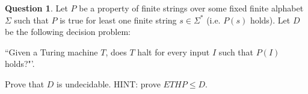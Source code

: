 \documentclass{article}
\theoremstyle{definition}
\newtheorem{Q}{Question}
\begin{document}
\begin{Q}
Let $P$ be a property of finite strings over some fixed finite alphabet $\Sigma$ such that $P$ is true for least one finite string $s\in\Sigma^*$ (i.e. $P(s)$ holds). Let $D$ be the following decision problem: 

``Given a Turing machine $T$, does $T$ halt for every input $I$ such that $P(I)$ holds?"'.

Prove that $D$ is undecidable. HINT: prove $ETHP\leq D$.
\end{Q}
\begin{comment}
\textbf{Solution}
Let $T$ be a Turing machine (an instance of ETHP). Define the machine $M_T$ that operates as follows:
\begin{enumerate}
\item $M_T$ erases the input.
\item $M_T$ computes $T(\varepsilon)$.
\end{enumerate}
Since $M_T$ is a Turing machine, it is an instance of $D$. We need to show that the reduction is correct.
\begin{itemize}
\item Suppose $T(\varepsilon)$ halts. Then $M_T(I)$ halts for all $I$, so it certainly halts for all $I$ such that $P(I)$ holds. I.e. a yes instance of ETHP becomes a yes instance of $D$.
\item Conversely, suppose $T(\varepsilon)$ does not halt. Then, in particular, if $s\in\Sigma^*$ is chosen so that $P(s)$ holds, we have that $M_T(s)$ does not halt. I.e. a no instance of ETHP becomes a no instance of $D$. 
\end{itemize}
\end{comment}
\end{document}
